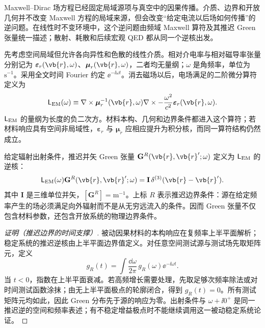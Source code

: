 Maxwell--Dirac 场方程已经固定局域源项与真空中的因果传播。介质、边界和开放几何并不改变 Maxwell 方程的局域来源，但会改变“给定电流以后场如何传播”的逆问题。在线性时不变环境中，这个逆问题由频域 Maxwell 算符及其推迟 Green 张量统一描述；散射、耗散和后续宏观 QED 都从同一个逆核出发。

先考虑空间局域但允许各向异性和色散的线性介质。相对介电率与相对磁导率张量分别记为 $\boldsymbol\varepsilon_r(\vb{r},\omega)$、$\boldsymbol\mu_r(\vb{r},\omega)$，二者均无量纲；$\omega$ 是角频率，单位为 $\mathrm{s^{-1}}$。采用全文时间 Fourier 约定 $\ee^{-\ii\omega t}$。消去磁场以后，电场满足的二阶微分算符定义为
\begin{equation}
 {
 \mathsf L_{\rm EM}(\omega)
 \equiv
 \nabla\times\boldsymbol\mu_r^{-1}(\vb{r},\omega)\nabla\times
 -\frac{\omega^2}{c^2}\boldsymbol\varepsilon_r(\vb{r},\omega).}
 \label{eq:Maxwell-operator-SI-r12}\end{equation}
$\mathsf L_{\rm EM}$ 的量纲为长度的负二次方。材料本构、几何和边界条件都进入这个算符；若材料响应具有空间非局域性，$\boldsymbol\varepsilon_r$ 与 $\boldsymbol\mu_r$ 应相应提升为积分核，而同一算符结构仍然成立。

\begin{definition}
给定辐射出射条件，推迟并矢 Green 张量 $\mathbf G^R(\vb{r},\vb{r}';\omega)$ 定义为 $\mathsf L_{\rm EM}$ 的逆核：
\begin{equation}
 {
 \mathsf L_{\rm EM}(\omega)
 \mathbf G^R(\vb{r},\vb{r}';\omega)
 =\mathbf I\,\delta^{(3)}(\vb{r}-\vb{r}').}
 \label{eq:GR-Maxwell-SI-r12}\end{equation}
其中 $\mathbf I$ 是三维单位并矢，$[\mathbf G^R]=\mathrm{m^{-1}}$。上标 $R$ 表示推迟边界条件：源在给定频率产生的场必须满足向外辐射而不是从无穷远流入的条件。因而 Green 张量不仅包含材料参数，还包含开放系统的物理边界条件。

\end{definition}

\begin{proof}[证明（推迟边界的时间支撑）]
被动因果材料的本构响应在复频率上半平面解析；稳定系统的推迟逆核由上半平面边界值定义。对任意空间测试源与测试场先取矩阵元，定义
\begin{equation*}
 g_R(t)=\int\frac{\dd\omega}{2\pi}\,g_R(\omega)\ee^{-\ii\omega t}.
\end{equation*}
当 $t<0$，指数在上半平面衰减。若高频增长需要处理，先取足够次频率除法或对时间测试函数涂抹；由无上半平面极点的轮廓闭合，得到 $g_R(t)=0$。所有测试矩阵元均如此，因此 Green 分布先于源的响应为零。出射条件与 $\omega+\ii0^+$ 是同一推迟逆的空间和频率表述；有不稳定增益极点时不能继续调用这一被动稳定系统论证。
\end{proof}

